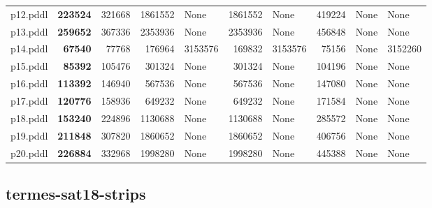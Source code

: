 \documentclass{article}
\begin{document}
\begin{tabular}{@{}lrrrrrrrrr@{}}
p12.pddl & \textbf{223524} & 321668 & 1861552 & \multicolumn{1}{|l|}{None} & 1861552 & \multicolumn{1}{|l|}{None} & 419224 & \multicolumn{1}{|l|}{None} & \multicolumn{1}{|l|}{None} \\
p13.pddl & \textbf{259652} & 367336 & 2353936 & \multicolumn{1}{|l|}{None} & 2353936 & \multicolumn{1}{|l|}{None} & 456848 & \multicolumn{1}{|l|}{None} & \multicolumn{1}{|l|}{None} \\
p14.pddl & \textbf{67540} & 77768 & 176964 & 3153576 & 169832 & 3153576 & 75156 & \multicolumn{1}{|l|}{None} & 3152260 \\
p15.pddl & \textbf{85392} & 105476 & 301324 & \multicolumn{1}{|l|}{None} & 301324 & \multicolumn{1}{|l|}{None} & 104196 & \multicolumn{1}{|l|}{None} & \multicolumn{1}{|l|}{None} \\
p16.pddl & \textbf{113392} & 146940 & 567536 & \multicolumn{1}{|l|}{None} & 567536 & \multicolumn{1}{|l|}{None} & 147080 & \multicolumn{1}{|l|}{None} & \multicolumn{1}{|l|}{None} \\
p17.pddl & \textbf{120776} & 158936 & 649232 & \multicolumn{1}{|l|}{None} & 649232 & \multicolumn{1}{|l|}{None} & 171584 & \multicolumn{1}{|l|}{None} & \multicolumn{1}{|l|}{None} \\
p18.pddl & \textbf{153240} & 224896 & 1130688 & \multicolumn{1}{|l|}{None} & 1130688 & \multicolumn{1}{|l|}{None} & 285572 & \multicolumn{1}{|l|}{None} & \multicolumn{1}{|l|}{None} \\
p19.pddl & \textbf{211848} & 307820 & 1860652 & \multicolumn{1}{|l|}{None} & 1860652 & \multicolumn{1}{|l|}{None} & 406756 & \multicolumn{1}{|l|}{None} & \multicolumn{1}{|l|}{None} \\
p20.pddl & \textbf{226884} & 332968 & 1998280 & \multicolumn{1}{|l|}{None} & 1998280 & \multicolumn{1}{|l|}{None} & 445388 & \multicolumn{1}{|l|}{None} & \multicolumn{1}{|l|}{None} \\
\end{tabular}

\hypertarget{search_start_memory-termes-sat18-strips}{}
\subsection*{termes-sat18-strips}
\end{document}
